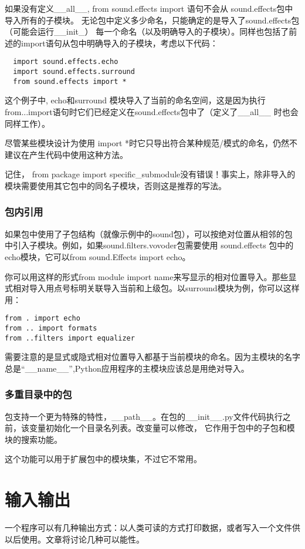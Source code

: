 \documentclass[UTF8]{ctexart}
\begin{document}
如果没有定义\_\_all\_\_, from sound.effects import \* 语句不会从 sound.effects包中导入所有的子模块。
无论包中定义多少命名，只能确定的是导入了sound.effects包（可能会运行\_\_init\_）
每一个命名（以及明确导入的子模块）。同样也包括了前述的import语句从包中明确导入的子模块，考虑以下代码：
\begin{verbatim}
  import sound.effects.echo
  import sound.effects.surround
  from sound.effects import *
\end{verbatim}

这个例子中, echo和surround 模块导入了当前的命名空间，这是因为执行 from...import语句时它们已经定义在sound.effects包中了（定义了\_\_all\_\_
时也会同样工作）。

尽管某些模块设计为使用 import *时它只导出符合某种规范/模式的命名，仍然不建议在产生代码中使用这种方法。

记住， from package import specific\_submodule没有错误！事实上，除非导入的模块需要使用其它包中的同名子模块，否则这是推荐的写法。
\subsubsection{包内引用}
如果包中使用了子包结构（就像示例中的sound包），可以按绝对位置从相邻的包中引入子模块。例如，如果sound.filters.vovoder包需要使用 sound.effects
包中的echo模块，它可以from sound.Effects import echo。

你可以用这样的形式from module import name来写显示的相对位置导入。那些显式相对导入用点号标明关联导入当前和上级包。以surround模块为例，你可以这样用：
\begin{verbatim}
from . import echo
from .. import formats
from ..filters import equalizer
\end{verbatim}

需要注意的是显式或隐式相对位置导入都基于当前模块的命名。因为主模块的名字总是``\_\_name\_\_'',Python应用程序的主模块应该总是用绝对导入。

\subsubsection{多重目录中的包}
包支持一个更为特殊的特性，\_\_path\_\_。在包的\_\_init\_\_.py文件代码执行之前，该变量初始化一个目录名列表。改变量可以修改，
它作用于包中的子包和模块的搜索功能。

这个功能可以用于扩展包中的模块集，不过它不常用。
\section{输入输出}
一个程序可以有几种输出方式：以人类可读的方式打印数据，或者写入一个文件供以后使用。文章将讨论几种可以能性。
\end{document}
